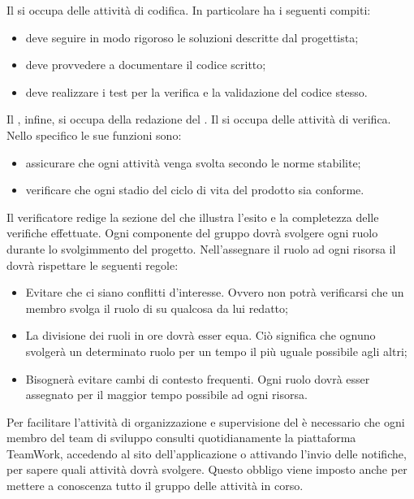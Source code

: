 				Il  si occupa delle attività di codifica. In particolare ha i seguenti compiti:
				\begin{itemize}
					\item deve seguire in modo rigoroso le soluzioni descritte dal progettista;
					\item deve provvedere a documentare il codice scritto;
					\item deve realizzare i test per la verifica e la validazione del codice stesso.
				\end{itemize}
				Il , infine, si occupa della redazione del .
				Il  si occupa delle attività di verifica. Nello specifico le sue funzioni sono:
				\begin{itemize}
					\item assicurare che ogni attività venga svolta secondo le norme stabilite;
					\item verificare che ogni stadio del ciclo di vita del prodotto sia conforme.
				\end{itemize}
				Il verificatore redige la sezione del  che illustra l’esito e la completezza delle verifiche effettuate.
			Ogni componente del gruppo dovrà svolgere ogni ruolo durante lo svolgimmento del progetto. Nell'assegnare il ruolo ad ogni risorsa
			il  dovrà rispettare le seguenti regole:
			\begin{itemize}
				\item Evitare che ci siano conflitti d'interesse. Ovvero non potrà verificarsi che un membro svolga il ruolo di 
				su qualcosa da lui redatto;
				\item La divisione dei ruoli in ore dovrà esser equa. Ciò significa che ognuno svolgerà un determinato ruolo per un tempo il più
				uguale possibile agli altri;
				\item Bisognerà evitare cambi di contesto frequenti. Ogni ruolo dovrà esser assegnato per il maggior tempo possibile ad ogni risorsa.
			\end{itemize}
		 \label{subsec:aggiornamentoStatoTicket}
			Per facilitare l'attività di organizzazione e supervisione del  è necessario che ogni membro del team di sviluppo consulti quotidianamente la piattaforma TeamWork, accedendo al sito dell'applicazione o attivando l'invio delle notifiche, per sapere quali attività dovrà svolgere. Questo obbligo viene imposto anche per mettere a conoscenza tutto il gruppo delle attività in corso.\\
